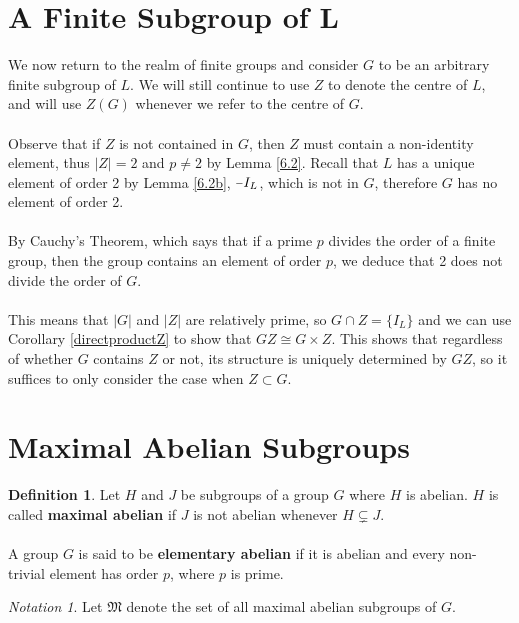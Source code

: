 \documentclass[a4paper , 11pt]{book}
\newcommand{\minus}{\scalebox{0.75}[1.0]{$-$}}
\theoremstyle{definition}
\newtheorem*{definition-non}{Definition}
\theoremstyle{remark}
\newtheorem*{notation-non}{Notation}
\begin{document}
\section[A finite subgroup of $L$]{A Finite Subgroup of $\pmb{L}$}

We now return to the realm of finite groups and consider $G$ to be an arbitrary finite subgroup of $L$. We will still continue to use $Z$ to denote the centre of $L$, and will use $Z(G)$ whenever we refer to the centre of $G$. \\
\\
Observe that if $Z$ is not contained in $G$, then $Z$ must contain a non-identity element, thus $|Z| = 2$ and $p \neq 2$ by Lemma \ref{6.2}. Recall that $L$ has a unique element of order 2 by Lemma \ref{6.2b}, $\minus I_L$, which is not in $G$, therefore $G$ has no element of order 2. \\
\\
By Cauchy's Theorem, which says that if a prime $p$ divides the order of a finite group, then the group contains an element of order $p$, we deduce that 2 does not divide the order of $G$. \\
\\
This means that $|G|$ and $|Z|$ are relatively prime, so $G \cap Z = \{ I_L \}$ and we can use Corollary \ref{directproductZ} to show that $GZ \cong G \times Z$. This shows that regardless of whether $G$ contains $Z$ or not, its structure is uniquely determined by $GZ$, so it suffices to only consider the case when $Z \subset G$. 

\section{Maximal Abelian Subgroups}

\begin{definition-non} Let $H$ and $J$ be subgroups of a group $G$ where $H$ is abelian. $H$ is called \textbf{maximal abelian} if $J$ is not abelian whenever $H \subsetneq J$. \\
\\
A group $G$ is said to be \textbf{elementary abelian} if it is abelian and every non-trivial element has order $p$, where $p$ is prime.
\end{definition-non}

\begin{notation-non} Let $\mathfrak{M}$ denote the set of all maximal abelian subgroups of $G$.
\end{notation-non}
\vspace{3mm}
\end{document}
